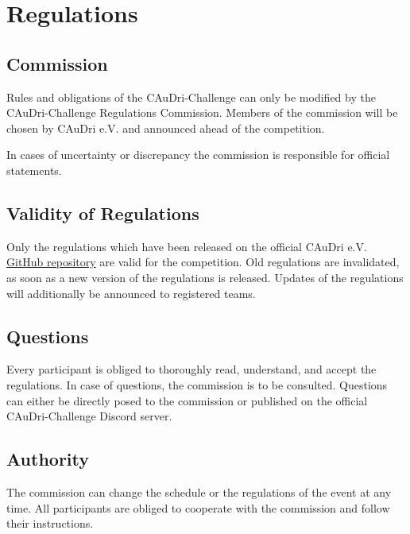 \chapter{Regulations}

\section{Commission}

Rules and obligations of the CAuDri-Challenge can only be modified by the
CAuDri-Challenge Regulations Commission. Members of the commission will be
chosen by CAuDri e.V. and announced ahead of the competition.

In cases of uncertainty or discrepancy the commission is responsible for
official statements.

\section{Validity of Regulations}

Only the regulations which have been released on the official CAuDri e.V.
\href{https://github.com/CAuDri/regulations/releases}{GitHub repository} are
valid for the competition. Old regulations are invalidated, as soon as a new
version of the regulations is released. Updates of the regulations will
additionally be announced to registered teams.

\section{Questions}

Every participant is obliged to thoroughly read, understand, and accept the
regulations. In case of questions, the commission is to be consulted. Questions
can either be directly posed to the commission or published on the official
CAuDri-Challenge Discord server.

\section{Authority}

The commission can change the schedule or the regulations of the event at any
time. All participants are obliged to cooperate with the commission and follow
their instructions.


